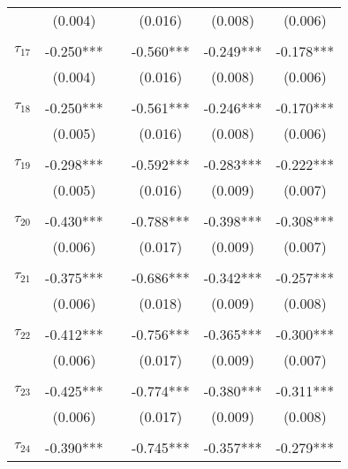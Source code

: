 \begin{tabular}{@{\extracolsep{-5pt}}lccccc}
                &  (0.004)  &&  (0.016)  &  (0.008)  &  (0.006)  \\
                &           &&           &           &           \\[-2.1ex]
$\tau_{17}$     & -0.250*** && -0.560*** & -0.249*** & -0.178*** \\
                &  (0.004)  &&  (0.016)  &  (0.008)  &  (0.006)  \\
                &           &&           &           &           \\[-2.1ex]
$\tau_{18}$     & -0.250*** && -0.561*** & -0.246*** & -0.170*** \\
                &  (0.005)  &&  (0.016)  &  (0.008)  &  (0.006)  \\
                &           &&           &           &           \\[-2.1ex]
$\tau_{19}$     & -0.298*** && -0.592*** & -0.283*** & -0.222*** \\
                &  (0.005)  &&  (0.016)  &  (0.009)  &  (0.007)  \\
                &           &&           &           &           \\[-2.1ex]
$\tau_{20}$     & -0.430*** && -0.788*** & -0.398*** & -0.308*** \\
                &  (0.006)  &&  (0.017)  &  (0.009)  &  (0.007)  \\
                &           &&           &           &           \\[-2.1ex]
$\tau_{21}$     & -0.375*** && -0.686*** & -0.342*** & -0.257*** \\
                &  (0.006)  &&  (0.018)  &  (0.009)  &  (0.008)  \\
                &           &&           &           &           \\[-2.1ex]
$\tau_{22}$     & -0.412*** && -0.756*** & -0.365*** & -0.300*** \\
                &  (0.006)  &&  (0.017)  &  (0.009)  &  (0.007)  \\
                &           &&           &           &           \\[-2.1ex]
$\tau_{23}$     & -0.425*** && -0.774*** & -0.380*** & -0.311*** \\
                &  (0.006)  &&  (0.017)  &  (0.009)  &  (0.008)  \\
                &           &&           &           &           \\[-2.1ex]
$\tau_{24}$     & -0.390*** && -0.745*** & -0.357*** & -0.279*** \\

\end{tabular}
